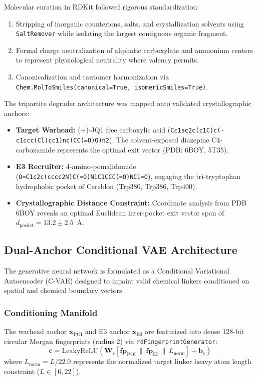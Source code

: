 \documentclass[conference]{IEEEtran}
\begin{document}
Molecular curation in RDKit followed rigorous standardization:
\begin{enumerate}
    \item Stripping of inorganic counterions, salts, and crystallization solvents using \texttt{SaltRemover} while isolating the largest contiguous organic fragment.
    \item Formal charge neutralization of aliphatic carboxylate and ammonium centers to represent physiological neutrality where valency permits.
    \item Canonicalization and tautomer harmonization via \texttt{Chem.MolToSmiles(canonical=True, isomericSmiles=True)}.
\end{enumerate}

The tripartite degrader architecture was mapped onto validated crystallographic anchors:
\begin{itemize}
    \item \textbf{Target Warhead:} (+)-JQ1 free carboxylic acid (\texttt{Cc1sc2c(c1C)c(-c1ccc(Cl)cc1)nc(CC(=O)O)n2}). The solvent-exposed diazepine C4-carboxamide represents the optimal exit vector (PDB: 6BOY, 5T35).
    \item \textbf{E3 Recruiter:} 4-amino-pomalidomide (\texttt{O=C1c2c(cccc2N)C(=O)N1C1CCC(=O)NC1=O}), engaging the tri-tryptophan hydrophobic pocket of Cereblon (Trp380, Trp386, Trp400).
    \item \textbf{Crystallographic Distance Constraint:} Coordinate analysis from PDB 6BOY reveals an optimal Euclidean inter-pocket exit vector span of $d_{\text{pocket}} = 13.2 \pm 2.5$~\AA.
\end{itemize}

\subsection{Dual-Anchor Conditional VAE Architecture}
The generative neural network is formulated as a Conditional Variational Autoencoder (C-VAE) designed to inpaint valid chemical linkers conditioned on spatial and chemical boundary vectors.

\subsubsection{Conditioning Manifold}
The warhead anchor $\mathbf{x}_{\text{POI}}$ and E3 anchor $\mathbf{x}_{\text{E3}}$ are featurized into dense 128-bit circular Morgan fingerprints (radius 2) via \texttt{rdFingerprintGenerator}:
\begin{equation}
\mathbf{c} = \text{LeakyReLU}\left(\mathbf{W}_c [\mathbf{fp}_{\text{POI}} \,\|\, \mathbf{fp}_{\text{E3}} \,\|\, L_{\text{norm}}] + \mathbf{b}_c\right)
\end{equation}
where $L_{\text{norm}} = L / 22.0$ represents the normalized target linker heavy atom length constraint ($L \in [6, 22]$).
\end{document}
